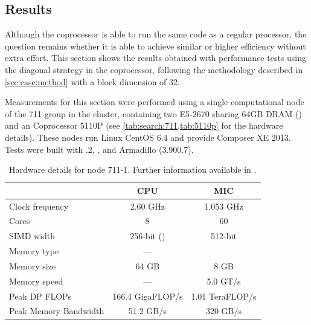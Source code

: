 \documentclass[../thesis]{subfiles}
\begin{document}
	\subsection{Results}
	\label{subsec:mic:native:results}

	Although the \intel\xeonphi coprocessor is able to run the same code as a regular \intel\xeon processor, the question remains whether it is able to achieve similar or higher efficiency without extra effort. This section shows the results obtained with performance tests using the diagonal strategy in the coprocessor, following the methodology described in \cref{sec:case:method} with a block dimension of 32.

	Measurements for this section were performed using a single computational node of the 711 group in the \search cluster, containing two \intel\xeon E5-2670 \cpus sharing 64GB DRAM (\numa) and an \intel\xeonphi Coprocessor 5110P (see \cref{tab:search:711,tab:5110p} for the hardware details). These nodes run Linux CentOS 6.4 and provide \intel Composer XE 2013. Tests were built with .2, \mkl, and Armadillo (3.900.7).

	\begin{table}[!b]
		\centering
		\begin{tabular}{|l|c|c|}
			\hline
			& \textbf{CPU} & \textbf{MIC}  \\
			\hline
			Clock frequency & 2.60 GHz & 1.053 GHz  \\
			Cores & 8 & 60  \\
			SIMD width & 256-bit (\avx) & 512-bit  \\
			Memory type & --- & \gddr5  \\
			Memory size & 64 GB & 8 GB  \\
			Memory speed & --- & 5.0 GT/s  \\
			\hline
			Peak DP FLOPs & 166.4 GigaFLOP/s & 1.01 TeraFLOP/s  \\
			Peak Memory Bandwidth & 51.2 GB/s & 320 GB/s  \\ 
			\hline
		\end{tabular}
		\caption{Hardware details for \search node 711-1. Further information available in \cite{Intel:Xeon:e5_2670,Intel:Xeon:e5_2600,Intel:XeonPhi:5110P}.}
		\label{tab:search:711}
	\end{table}
\end{document}
